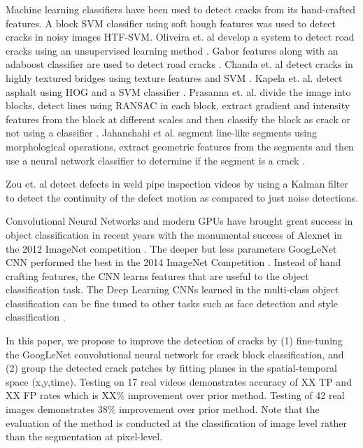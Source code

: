     Machine learning classifiers have been used to detect cracks from its hand-crafted features. A block SVM classifier using soft hough features was used to detect cracks in noisy images HTF-SVM. Oliveira et. al develop a system to detect road cracks using an unsupervised learning method \cite{Oliveira2013} \cite{Oliveira2014}.  Gabor features along with an adaboost classifier are used to detect road cracks \cite{Medina2014}.  Chanda et. al  detect cracks in highly textured bridges using texture features and SVM \cite{chanda2014}. Kapela et. al. detect asphalt using HOG and a SVM classifier \cite{Kapela2015}. Prasanna et. al. divide the image into blocks, detect lines using RANSAC in each block, extract gradient and intensity features from the block at different scales and then classify the block as crack or not using a classifier \cite{Prasanna2014}. Jahanshahi et al. segment line-like segments using morphological operations, extract geometric features from the segments and then use a neural network classifier to determine if the segment is a crack \cite{jahanshahi2013}. 

    Zou et. al detect defects in weld pipe inspection videos by using a Kalman filter to detect the continuity of the defect motion as compared to just noise detections.   \cite{Zou2015}

    Convolutional Neural Networks and modern GPUs have brought great success in object classification in recent years with the monumental success of Alexnet in the 2012 ImageNet competition \cite{krizhevsky2012}.  The deeper but less parameters GoogLeNet CNN performed the best in the 2014 ImageNet Competition \cite{szegedy2014}. Instead of hand crafting features, the CNN learns features that are useful to the object classification task. The Deep Learning CNNs learned in the multi-class object classification can be fine tuned to other tasks such as face detection \cite{farfade2015} and style classification \cite{karayev2013}.

    In this paper, we propose to improve the detection of cracks by (1) fine-tuning the GoogLeNet convolutional neural network for crack block classification, and (2) group the detected crack patches by fitting planes in the spatial-temporal space (x,y,time). Testing on 17 real videos demonstrates accuracy of XX TP and XX FP rates which is XX\% improvement over prior method. Testing of 42 real images demonstrates 38\% improvement over prior method. Note that the evaluation of the method is conducted at the classification of image level rather than the segmentation at pixel-level.




